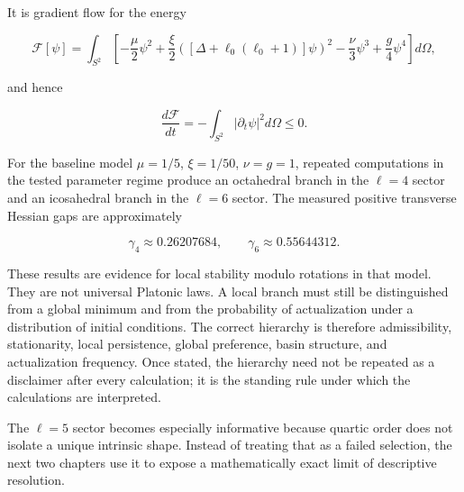 It is gradient flow for the energy

\[
\mathcal F[\psi]=\int_{S^2}\left[-\frac\mu2\psi^2+\frac\xi2\left([\Delta+\ell_0(\ell_0+1)]\psi\right)^2-\frac\nu3\psi^3+\frac g4\psi^4\right]d\Omega,
\]

and hence

\[
\frac{d\mathcal F}{dt}=-\int_{S^2}|\partial_t\psi|^2d\Omega\le0.
\]

For the baseline model $\mu=1/5$, $\xi=1/50$, $\nu=g=1$, repeated computations in the tested parameter regime produce an octahedral branch in the $\ell=4$ sector and an icosahedral branch in the $\ell=6$ sector. The measured positive transverse Hessian gaps are approximately

\[
\gamma_4\approx0.26207684,
\qquad
\gamma_6\approx0.55644312.
\]

These results are evidence for local stability modulo rotations in that model. They are not universal Platonic laws. A local branch must still be distinguished from a global minimum and from the probability of actualization under a distribution of initial conditions. The correct hierarchy is therefore admissibility, stationarity, local persistence, global preference, basin structure, and actualization frequency. Once stated, the hierarchy need not be repeated as a disclaimer after every calculation; it is the standing rule under which the calculations are interpreted.

The $\ell=5$ sector becomes especially informative because quartic order does not isolate a unique intrinsic shape. Instead of treating that as a failed selection, the next two chapters use it to expose a mathematically exact limit of descriptive resolution.
